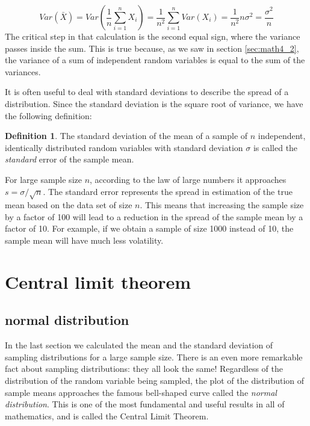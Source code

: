 \documentclass[
]{book}
\theoremstyle{definition}
\newtheorem{definition}{Definition}[chapter]
\theoremstyle{definition}
\theoremstyle{definition}
\theoremstyle{remark}
\begin{document}
\[ Var(\bar X) = Var\left(\frac{1}{n} \sum_{i=1}^{n} X_i\right)  = 
 \frac{1}{n^2} \sum_{i=1}^{n}Var(X_i) =  \frac{1}{n^2} n \sigma^2 = \frac{\sigma^2}{n}\]
The critical step in that calculation is the second equal sign, where the variance passes inside the sum. This is true because, as we saw in section \ref{sec:math4_2}, the variance of a sum of independent random variables is equal to the sum of the variances.

It is often useful to deal with standard deviations to describe the spread of a distribution. Since the standard deviation is the square root of variance, we have the following definition:

\begin{definition}
\protect\hypertarget{def:std-err}{}{\label{def:std-err} }The standard deviation of the mean of a sample of \(n\) independent, identically distributed random variables with standard deviation \(\sigma\) is called the \emph{standard} error of the sample mean.
\end{definition}

For large sample size \(n\), according to the law of large numbers it approaches \(s= \sigma/\sqrt{n}\). The standard error represents the spread in estimation of the true mean based on the data set of size \(n\). This means that increasing the sample size by a factor of 100 will lead to a reduction in the spread of the sample mean by a factor of 10. For example, if we obtain a sample of size 1000 instead of 10, the sample mean will have much less volatility.

\hypertarget{central-limit-theorem}{%
\section{Central limit theorem}\label{central-limit-theorem}}

\hypertarget{normal-distribution}{%
\subsection{normal distribution}\label{normal-distribution}}

In the last section we calculated the mean and the standard deviation of sampling distributions for a large sample size. There is an even more remarkable fact about sampling distributions: they all look the same!
Regardless of the distribution of the random variable being sampled, the plot of the distribution of sample means approaches the famous bell-shaped curve called the \emph{normal distribution}. This is one of the most fundamental and useful results in all of mathematics, and is called the Central Limit Theorem.
\end{document}
